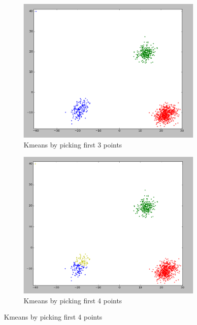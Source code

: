 \begin{figure}
  \begin{subfigure}{.33\textwidth}
    \centering
    \includegraphics[width=\textwidth]{shots/clusters-firstk-3}
    \caption{Kmeans by picking first 3 points}
    \label{1-trilinear-compositing}
  \end{subfigure}
  \begin{subfigure}{.33\textwidth}
    \centering
    \includegraphics[width=\textwidth]{shots/clusters-firstk-4}
    \caption{Kmeans by picking first 4 points}
    \label{1-trilinear-compositing}
  \end{subfigure}

\end{figure}
